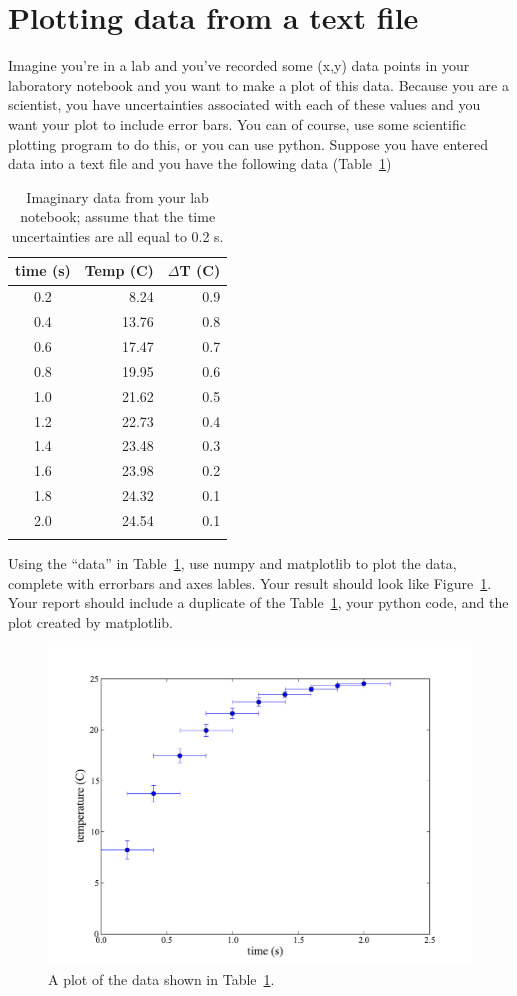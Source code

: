 \section{Plotting data from a text file}
Imagine you're in a lab and you've recorded some (x,y) data points in your laboratory notebook and you want to make a plot of this data. Because you are a scientist, you have uncertainties associated with each of these values and you want your plot to include error bars. 
You can of course, use some scientific plotting program to do this, or you can use python. Suppose you have entered data into a text file and you have the following data (Table~\ref{tab:sampleData})
\begin{table}
\caption{Imaginary data from your lab notebook; assume that the time uncertainties are all equal to 0.2 s.}\label{tab:sampleData}
\vspace*{3mm}
\begin{tabular}{crr}
\toprule
time (s)	& Temp (C)	& $\Delta$T (C)\\
\midrule
0.2		& 8.24	 & 0.9\\
0.4		& 13.76	 & 0.8\\
0.6		& 17.47	 & 0.7\\
0.8		& 19.95	 & 0.6\\
1.0		& 21.62	 & 0.5\\
1.2		& 22.73	 & 0.4\\
1.4		& 23.48	 & 0.3\\
1.6		& 23.98	 & 0.2\\
1.8		& 24.32	 & 0.1\\
2.0		& 24.54	 & 0.1\\
\bottomrule
\vspace*{4mm}
\end{tabular}
\end{table}

\begin{exercise}
	Using the ``data'' in Table~\ref{tab:sampleData}, use numpy and matplotlib to plot the data, complete with errorbars and axes lables. Your result should look like Figure~\ref{fig:sampleDataPlot}. Your report should include a duplicate of the Table~\ref{tab:sampleData}, your python code, and the plot created by matplotlib.
\end{exercise}


\begin{figure}[htb]
  \includegraphics[width=.85\linewidth]{Figures/SimplePlots/dataPlot.pdf}%
  \caption{A plot of the data shown in Table~\ref{tab:sampleData}.}
  \label{fig:sampleDataPlot}%
\end{figure}

